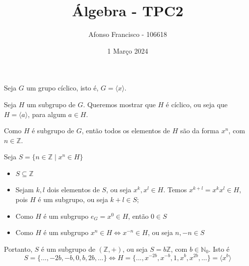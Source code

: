 \documentclass{article}
\title{Álgebra - TPC2}
\author{Afonso Francisco - 106618 }
\date{1 Março 2024}
\begin{document}
\maketitle

Seja $G$ um grupo cíclico, isto é, $G=\langle x \rangle$.

Seja $H$ um subgrupo de $G$. Queremos mostrar que $H$ é cíclico, ou seja que $H=\langle a \rangle$, para algum $a \in H$.

Como $H$ é subgrupo de $G$, então todos os elementos de $H$ são da forma $x^n$, com $n \in \mathbb{Z}$.

Seja $S=\{n\in \mathbb{Z} \mid x^n\in H\}$
\begin{itemize}
\item $S\subseteq \mathbb{Z}$
\item Sejam $k,l$ dois elementos de $S$, ou seja $x^k,x^l \in H$. Temos $x^{k+l}=x^kx^l\in H$, pois $H$ é um subgrupo, ou seja $k+l\in S$;
\item Como $H$ é um subgrupo $e_G=x^0\in H$, então $0\in S$
\item Como $H$ é um subgrupo $x^n \in H \Leftrightarrow x^{-n}\in H$, ou seja $n,-n \in S$
\end{itemize}
Portanto, $S$ é um subgrupo de $(\mathbb{Z},+)$, ou seja $S=b\mathbb{Z}$, com $b\in \mathbb{N}_0$. Isto é  $$S=\{...,-2b,-b,0,b,2b,...\} \Leftrightarrow H=\{...,x^{-2b},x^{-b},1,x^b,x^{2b},...\}=\langle x^b \rangle$$
\end{document}
